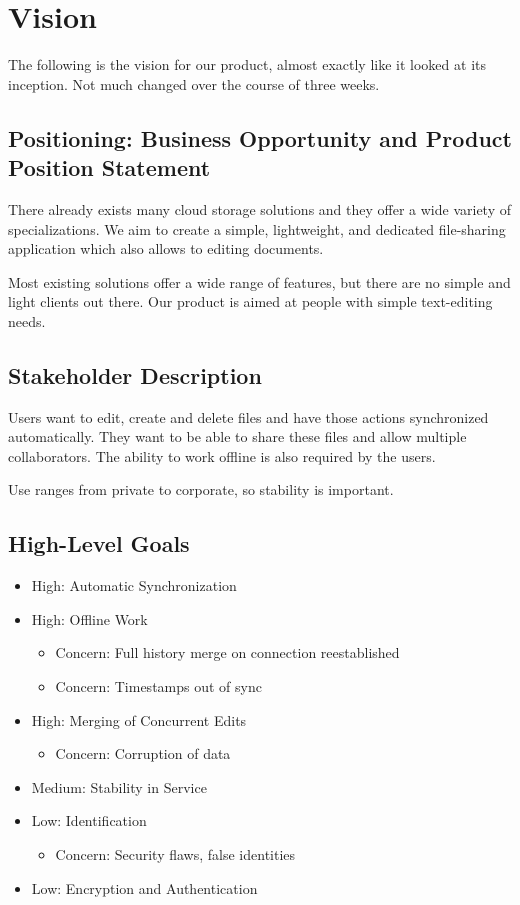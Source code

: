 \section{Vision}
\label{sec:vision}

The following is the vision for our product, almost exactly like it looked at its inception. Not much changed
over the course of three weeks.

\subsection{Positioning: Business Opportunity and Product Position Statement}
There already exists many cloud storage solutions and they offer a wide variety of specializations. We aim to create a simple, lightweight, and dedicated file-sharing application which also allows to editing documents.

Most existing solutions offer a wide range of features, but there are no simple and light clients out there.
Our product is aimed at people with simple text-editing needs.

\subsection{Stakeholder Description}
Users want to edit, create and delete files and have those actions synchronized automatically. They want to be able to share these files and allow multiple collaborators. The ability to work offline is also required by the users.

Use ranges from private to corporate, so stability is important.

\subsection{High-Level Goals}

\begin{itemize}
    \item High: Automatic Synchronization
    \item High: Offline Work 
    \begin{itemize}
        \item Concern: Full history merge on connection reestablished
        \item Concern: Timestamps out of sync
    \end{itemize}
    \item High: Merging of Concurrent Edits
    \begin{itemize}
        \item Concern: Corruption of data
    \end{itemize}
    \item Medium: Stability in Service
    \item Low: Identification
    \begin{itemize}
        \item Concern: Security flaws, false identities
    \end{itemize}
    \item Low: Encryption and Authentication
\end{itemize}
    
